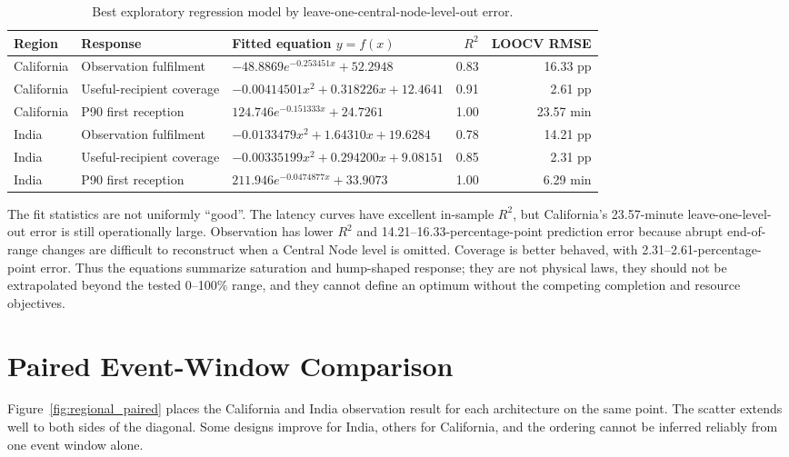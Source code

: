 \begin{table}[htbp]
\centering
\caption{Best exploratory regression model by leave-one-central-node-level-out error.}
\label{tab:regression_best}
\scriptsize
\begin{tabularx}{\textwidth}{L{0.13\textwidth}L{0.19\textwidth}Yrr}
\toprule
Region & Response & Fitted equation $y=f(x)$ & $R^2$ & LOOCV RMSE \\
\midrule
California & Observation fulfilment & $-48.8869e^{-0.253451x}+52.2948$ & 0.83 & 16.33 pp \\
California & Useful-recipient coverage & $-0.00414501x^2+0.318226x+12.4641$ & 0.91 & 2.61 pp \\
California & P90 first reception & $124.746e^{-0.151333x}+24.7261$ & 1.00 & 23.57 min \\
India & Observation fulfilment & $-0.0133479x^2+1.64310x+19.6284$ & 0.78 & 14.21 pp \\
India & Useful-recipient coverage & $-0.00335199x^2+0.294200x+9.08151$ & 0.85 & 2.31 pp \\
India & P90 first reception & $211.946e^{-0.0474877x}+33.9073$ & 1.00 & 6.29 min \\
\bottomrule
\end{tabularx}
\end{table}

The fit statistics are not uniformly ``good''. The latency curves have excellent in-sample $R^2$, but California's 23.57-minute leave-one-level-out error is still operationally large. Observation has lower $R^2$ and 14.21--16.33-percentage-point prediction error because abrupt end-of-range changes are difficult to reconstruct when a Central Node level is omitted. Coverage is better behaved, with 2.31--2.61-percentage-point error. Thus the equations summarize saturation and hump-shaped response; they are not physical laws, they should not be extrapolated beyond the tested 0--100\% range, and they cannot define an optimum without the competing completion and resource objectives.

\section{Paired Event-Window Comparison}

Figure~\ref{fig:regional_paired} places the California and India observation result for each architecture on the same point. The scatter extends well to both sides of the diagonal. Some designs improve for India, others for California, and the ordering cannot be inferred reliably from one event window alone.

